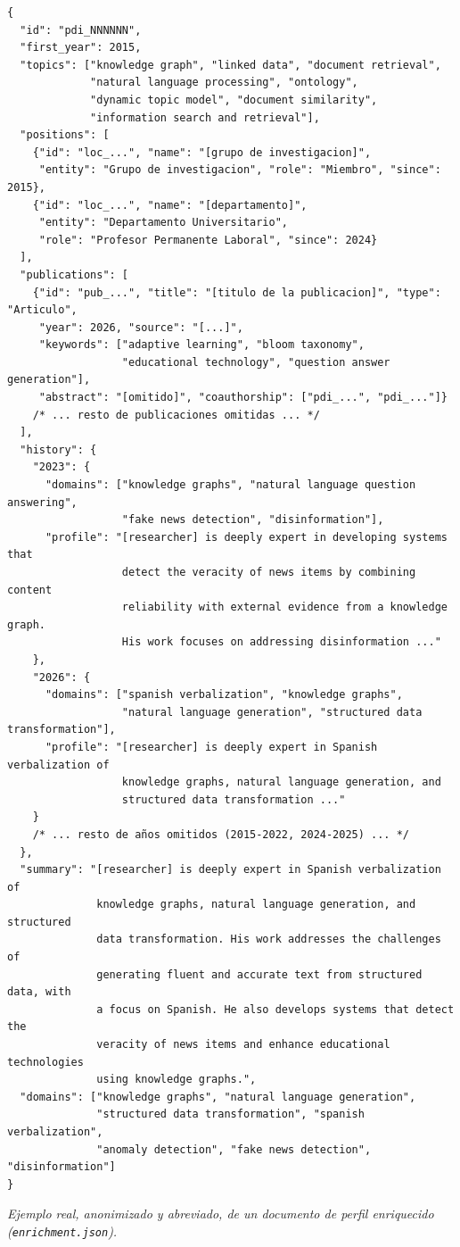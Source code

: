 \begin{lstlisting}[style=upmcode]
{
  "id": "pdi_NNNNNN",
  "first_year": 2015,
  "topics": ["knowledge graph", "linked data", "document retrieval",
             "natural language processing", "ontology",
             "dynamic topic model", "document similarity",
             "information search and retrieval"],
  "positions": [
    {"id": "loc_...", "name": "[grupo de investigacion]",
     "entity": "Grupo de investigacion", "role": "Miembro", "since": 2015},
    {"id": "loc_...", "name": "[departamento]",
     "entity": "Departamento Universitario",
     "role": "Profesor Permanente Laboral", "since": 2024}
  ],
  "publications": [
    {"id": "pub_...", "title": "[titulo de la publicacion]", "type": "Articulo",
     "year": 2026, "source": "[...]",
     "keywords": ["adaptive learning", "bloom taxonomy",
                  "educational technology", "question answer generation"],
     "abstract": "[omitido]", "coauthorship": ["pdi_...", "pdi_..."]}
    /* ... resto de publicaciones omitidas ... */
  ],
  "history": {
    "2023": {
      "domains": ["knowledge graphs", "natural language question answering",
                  "fake news detection", "disinformation"],
      "profile": "[researcher] is deeply expert in developing systems that
                  detect the veracity of news items by combining content
                  reliability with external evidence from a knowledge graph.
                  His work focuses on addressing disinformation ..."
    },
    "2026": {
      "domains": ["spanish verbalization", "knowledge graphs",
                  "natural language generation", "structured data transformation"],
      "profile": "[researcher] is deeply expert in Spanish verbalization of
                  knowledge graphs, natural language generation, and
                  structured data transformation ..."
    }
    /* ... resto de años omitidos (2015-2022, 2024-2025) ... */
  },
  "summary": "[researcher] is deeply expert in Spanish verbalization of
              knowledge graphs, natural language generation, and structured
              data transformation. His work addresses the challenges of
              generating fluent and accurate text from structured data, with
              a focus on Spanish. He also develops systems that detect the
              veracity of news items and enhance educational technologies
              using knowledge graphs.",
  "domains": ["knowledge graphs", "natural language generation",
              "structured data transformation", "spanish verbalization",
              "anomaly detection", "fake news detection", "disinformation"]
}
\end{lstlisting}
\noindent\textit{Ejemplo real, anonimizado y abreviado, de un documento de perfil enriquecido (\texttt{enrichment.json}).}


